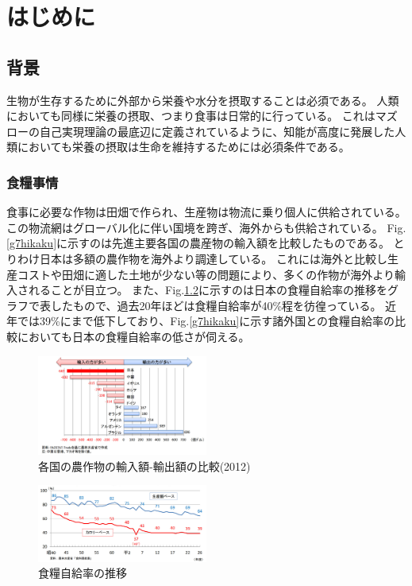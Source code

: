 \chapter{はじめに}
\section{背景}
生物が生存するために外部から栄養や水分を摂取することは必須である。
人類においても同様に栄養の摂取、つまり食事は日常的に行っている。
これはマズローの自己実現理論の最底辺に定義されているように、知能が高度に発展した人類においても栄養の摂取は生命を維持するためには必須条件である。\cite{maslow}
\subsection{食糧事情}
食事に必要な作物は田畑で作られ、生産物は物流に乗り個人に供給されている。
この物流網はグローバル化に伴い国境を跨ぎ、海外からも供給されている。
Fig.\ref{g7hikaku}に示すのは先進主要各国の農産物の輸入額を比較したものである。
とりわけ日本は多額の農作物を海外より調達している。
これには海外と比較し生産コストや田畑に適した土地が少ない等の問題により、多くの作物が海外より輸入されることが目立つ。\cite{FoodReport}
また、Fig.\ref{suii}に示すのは日本の食糧自給率の推移をグラフで表したもので、過去20年ほどは食糧自給率が40\%程を彷徨っている。
近年では39\%にまで低下しており、Fig.\ref{g7hikaku}に示す諸外国との食糧自給率の比較においても日本の食糧自給率の低さが伺える。
\begin{figure}[b] 
    \centering
    \includegraphics[width=0.5\textwidth]{image/intro/shokuryou_yunyuugaku.jpg}
    \caption{各国の農作物の輸入額-輸出額の比較(2012)} 
    \label{kingaku}
\end{figure}
\begin{figure}[b] 
    \centering
    \includegraphics[width=0.5\textwidth]{image/intro/shokuryou_suii.jpg}
    \caption{食糧自給率の推移} 
    \label{suii}
\end{figure}
